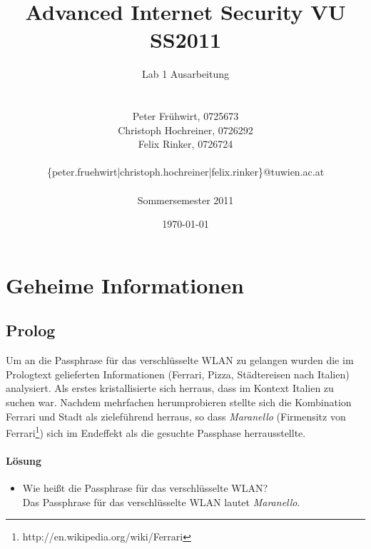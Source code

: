 \documentclass[12pt]{article}
\title{Advanced Internet Security VU SS2011}
\author{
	Lab 1 Ausarbeitung\\
	\\
	\\
	Peter Fr\"uhwirt, 0725673  \\
	Christoph Hochreiner, 0726292 \\
	Felix Rinker, 0726724 \\
	\\
	\{peter.fruehwirt|christoph.hochreiner|felix.rinker\}@tuwien.ac.at\\
	\\
	Sommersemester 2011
}
\date{\today}
\begin{document}
\maketitle

\newpage
\tableofcontents
\newpage
\listoffigures

\lstlistoflistings
\newpage

\section{Geheime Informationen}

\subsection{Prolog}

Um an die Passphrase für das verschlüsselte WLAN zu gelangen wurden die im Prologtext gelieferten Informationen (Ferrari, Pizza, Städtereisen nach Italien) analysiert. Als erstes kristallisierte sich herraus, dass im Kontext Italien zu suchen war. Nachdem mehrfachen herumprobieren stellte sich die Kombination Ferrari und Stadt als zieleführend herraus, so dass \textit{Maranello} (Firmensitz von Ferrari\footnote{http://en.wikipedia.org/wiki/Ferrari}) sich im Endeffekt als die gesuchte Passphase herrausstellte.

\paragraph{Lösung}
\begin{itemize}
	\item Wie heißt die Passphrase für das verschlüsselte WLAN? \\
		Das  Passphrase für das verschlüsselte WLAN lautet \textit{Maranello}.
\end{itemize}
\end{document}

